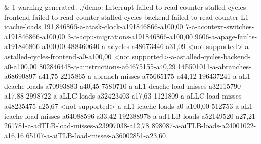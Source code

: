 &
1 warning generated. ./demo: Interrupt failed to read counter stalled-cycles-frontend failed to read counter stalled-cycles-backend failed to read counter L1-icache-loads 191,846866-a-atask-clock-a191846866-a100,00 7-a-acontext-switches-a191846866-a100,00 3-a-acpu-migrations-a191846866-a100,00 9606-a-apage-faults-a191846866-a100,00 488460640-a-acycles-a48673446-a31,09 <not supported>-a-astalled-cycles-frontend-a0-a100,00 <not supported>-a-astalled-cycles-backend-a0-a100,00 802846448-a-ainstructions-a64675155-a40,29 145501011-a-abranches-a68690897-a41,75 2215865-a-abranch-misses-a75665175-a44,12 196437241-a-aL1-dcache-loads-a70993883-a40,45 7580710-a-aL1-dcache-load-misses-a32115790-a17,88 2998722-a-aLLC-loads-a32423403-a17,63 1121809-a-aLLC-load-misses-a48235475-a25,67 <not supported>-a-aL1-icache-loads-a0-a100,00 512753-a-aL1-icache-load-misses-a64088596-a33,42 192388978-a-adTLB-loads-a52149520-a27,21 261781-a-adTLB-load-misses-a23997038-a12,78 898087-a-aiTLB-loads-a24001022-a16,16 65107-a-aiTLB-load-misses-a36002851-a23,60
